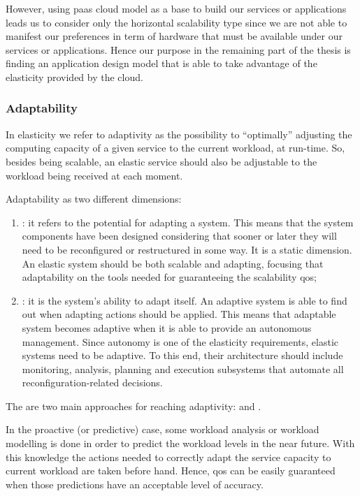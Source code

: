 However, using \ac{paas} cloud model as a base to build our services or applications leads us to consider
only the horizontal scalability type since we are not able to manifest our preferences in term of hardware
that must be available under our services or applications. Hence our purpose in the remaining part of the
thesis is finding an application design model that is able to take advantage of the elasticity
provided by the cloud.

\subsubsection*{Adaptability}
\label{sec:elasticity-requirements-adaptability}
In elasticity we refer to adaptivity as the possibility to ``optimally'' adjusting the computing capacity
of a given service to the current workload, at run-time. So, besides being scalable, an elastic service
should also be adjustable to the workload being received at each moment.

Adaptability as two different dimensions:

\begin{enumerate}
	\item{: it refers to the potential for adapting a system. This means that the
		system components have been designed considering that sooner or later they will need to be
		reconfigured or restructured in some way. It is a static dimension. An elastic system should be
		both scalable and adapting, focusing that adaptability on the tools needed for guaranteeing the
		scalability \ac{qos};}
	\item{: it is the system's ability to adapt itself. An adaptive system is able
		to find out when adapting actions should be applied. This means that adaptable system becomes
		adaptive when it is able to provide an autonomous management. Since autonomy is one of the
		elasticity requirements, elastic systems need to be adaptive. To this end, their architecture
		should include monitoring, analysis, planning and execution subsystems that automate all
		reconfiguration-related decisions.}
\end{enumerate}

The are two main approaches for reaching adaptivity:  and .

In the proactive (or predictive) case, some workload analysis or workload modelling is done in order
to predict the workload levels in the near future. With this knowledge the actions needed to correctly
adapt the service capacity to current workload are taken before hand. Hence, \ac{qos} can be easily
guaranteed when those predictions have an acceptable level of accuracy.

